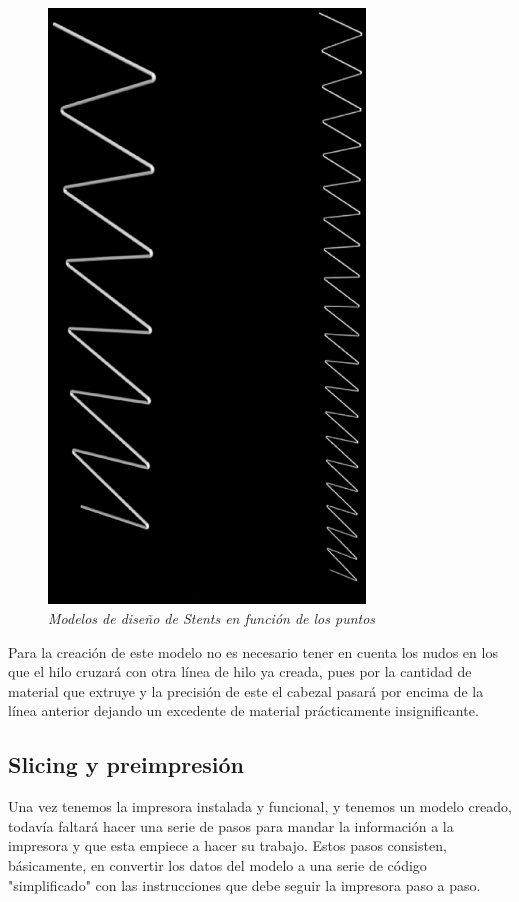 \documentclass[a4paper,12pt]{article}
\begin{document}
	\begin{figure}[!ht]
	\begin{center}
	  \includegraphics[width=0.75\textwidth]{Figuras/modeloStents.eps}
	  \caption{\emph{Modelos de diseño de Stents en función de los puntos}}
	\end{center}
	\label{fig:modeloStents}
	\end{figure}

Para la creación de este modelo no es necesario tener en cuenta los nudos en los que el hilo cruzará con otra línea de hilo ya creada, pues por la cantidad de material que extruye y la precisión de este el cabezal pasará por encima de la línea anterior dejando un excedente de material prácticamente insignificante.\\

\FloatBarrier
\subsection{Slicing y preimpresión}
Una vez tenemos la impresora instalada y funcional, y tenemos un modelo creado, todavía faltará hacer una serie de pasos para mandar la información a la impresora y que esta empiece a hacer su trabajo. Estos pasos consisten, básicamente, en convertir los datos del modelo a una serie de código "simplificado" con las instrucciones que debe seguir la impresora paso a paso.
\end{document}
